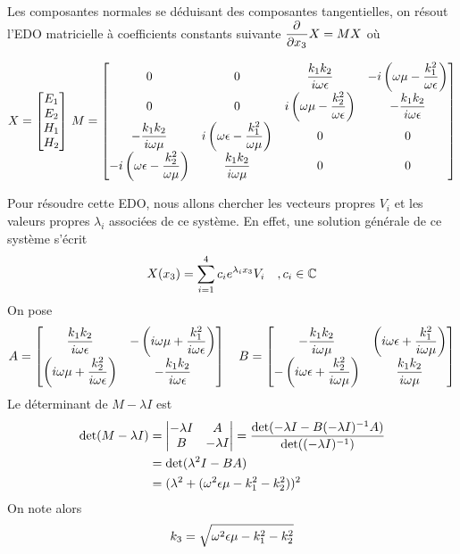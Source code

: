 Les composantes normales se déduisant des composantes tangentielles, on résout l'EDO matricielle à coefficients constants 
suivante $\dfrac{\partial^{{}} }{{\partial x_3}^{{}}}X = M X$ où

\begin{equation}
    X = 
    \begin{bmatrix}
    E_1 \\ 
    E_2 \\ 
    H_1 \\ 
    H_2 \\
    \end{bmatrix}\,
    M = \begin{bmatrix}
    0 & 0 & \dfrac{k_1k_2}{i\omega\epsilon} & -i\left(\omega\mu - \dfrac{k_1^2}{\omega\epsilon}\right)\\
    0 & 0 & i\left(\omega\mu - \dfrac{k_2^2}{\omega\epsilon}\right) & -\dfrac{k_1k_2}{i\omega\epsilon}\\
    -\dfrac{k_1k_2}{i\omega\mu} & i\left(\omega\epsilon - \dfrac{k_1^2}{\omega\mu}\right) & 0 & 0 \\
    -i\left(\omega\epsilon - \dfrac{k_2^2}{\omega\mu}\right) & \dfrac{k_1k_2}{i\omega\mu} & 0 & 0 \\
    \end{bmatrix}
\end{equation}

Pour résoudre cette EDO, nous allons chercher les vecteurs propres $V_i$ et les valeurs propres $\lambda_i$ associées de ce système. En effet, une solution générale de ce système s'écrit
\begin{equation}
    X(x_3)= \sum\limits_{i=1}^{4}c_i e^{\lambda_i x_3} V_i \quad , c_i \in \mathbb C
\end{equation}
On pose 
\begin{equation}
    A = \begin{bmatrix}
        \dfrac{k_1k_2}{i\omega\epsilon} & -\left(i\omega\mu + \dfrac{k_1^2}{i\omega\epsilon}\right) \\
        \left(i\omega\mu + \dfrac{k_2^2}{i\omega\epsilon}\right) & -\dfrac{k_1k_2}{i\omega\epsilon} \\
    \end{bmatrix}
    \quad
    B = \begin{bmatrix}
        -\dfrac{k_1k_2}{i\omega\mu} & \left(i\omega\epsilon + \dfrac{k_1^2}{i\omega\mu}\right) \\
        -\left(i\omega\epsilon + \dfrac{k_2^2}{i\omega\mu}\right) & \dfrac{k_1k_2}{i\omega\mu} \\
    \end{bmatrix}
\end{equation}
Le déterminant de $M-\lambda I$ est
\begin{align*}
    \det(M-\lambda I) &= 
    \begin{vmatrix}
        -\lambda I & A \\
        B & -\lambda I
    \end{vmatrix}
        = \dfrac{\det(- \lambda I - B(-\lambda I)^{-1} A)}{\det((-\lambda I)^{-1})} \\
        &= \det(\lambda^2 I - BA) \\
        &= (\lambda^2 + (\omega^2\epsilon\mu - k_1^2 -k_2^2))^2
\end{align*}
On note alors 
\begin{equation}
k_3=\sqrt{\omega^2\epsilon\mu - k_1^2 -k_2^2}
\end{equation}

